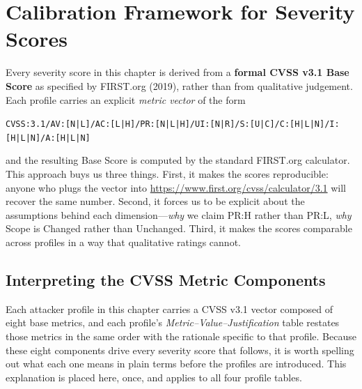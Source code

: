 \documentclass[12pt, a4paper]{report}
\newcommand{\cvssvec}[1]{\texttt{\small #1}}
\begin{document}
\section{Calibration Framework for Severity Scores}
\label{sec:cvss-framework}

Every severity score in this chapter is derived from a \textbf{formal CVSS
v3.1 Base Score} as specified by FIRST.org (2019), rather than from qualitative
judgement. Each profile carries an explicit \emph{metric vector} of the form

\begin{center}
\cvssvec{CVSS:3.1/AV:[N|L]/AC:[L|H]/PR:[N|L|H]/UI:[N|R]/S:[U|C]/C:[H|L|N]/I:[H|L|N]/A:[H|L|N]}
\end{center}

and the resulting Base Score is computed by the standard FIRST.org
calculator. This approach buys us three things. First, it makes the
scores reproducible: anyone who plugs the vector into
\url{https://www.first.org/cvss/calculator/3.1} will recover the same
number. Second, it forces us to be explicit about the assumptions behind
each dimension---\emph{why} we claim PR:H rather than PR:L, \emph{why}
Scope is Changed rather than Unchanged. Third, it makes the scores
comparable across profiles in a way that qualitative ratings cannot.

\subsection{Interpreting the CVSS Metric Components}
\label{sec:cvss-metrics-explained}

Each attacker profile in this chapter carries a CVSS v3.1 vector composed
of eight base metrics, and each profile's \emph{Metric--Value--Justification}
table restates those metrics in the same order with the rationale specific
to that profile. Because these eight components drive every severity score
that follows, it is worth spelling out what each one means in plain terms
before the profiles are introduced. This explanation is placed here, once,
and applies to all four profile tables.
\end{document}
